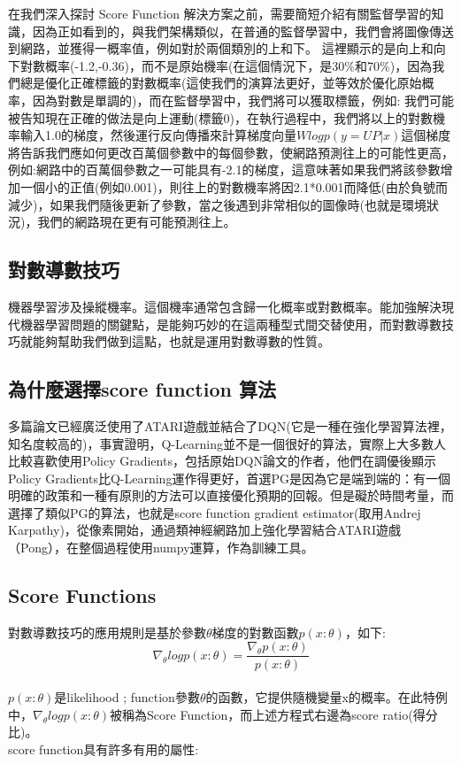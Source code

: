 \documentclass[14pt,a4paper]{report}  %
\begin{document}
 在我們深入探討 Score Function 解決方案之前，需要簡短介紹有關監督學習的知識，因為正如看到的，與我們架構類似，在普通的監督學習中，我們會將圖像傳送到網路，並獲得一概率值，例如對於兩個類別的上和下。 這裡顯示的是向上和向下對數概率(-1.2,-0.36)，而不是原始機率(在這個情況下，是30$\%$和70$\%$)，因為我們總是優化正確標籤的對數概率(這使我們的演算法更好，並等效於優化原始概率，因為對數是單調的)，而在監督學習中，我們將可以獲取標籤，例如:
我們可能被告知現在正確的做法是向上運動(標籤0)，在執行過程中，我們將以上的對數機率輸入1.0的梯度，然後運行反向傳播來計算梯度向量$Wlogp(y=UP|x)$這個梯度將告訴我們應如何更改百萬個參數中的每個參數，使網路預測往上的可能性更高，例如:網路中的百萬個參數之一可能具有-2.1的梯度，這意味著如果我們將該參數增加一個小的正值(例如0.001)，則往上的對數機率將因2.1*0.001而降低(由於負號而減少)，如果我們隨後更新了參數，當之後遇到非常相似的圖像時(也就是環境狀況)，我們的網路現在更有可能預測往上。\\

\subsection{對數導數技巧}
 機器學習涉及操縱機率。這個機率通常包含歸一化概率或對數概率。能加強解決現代機器學習問題的關鍵點，是能夠巧妙的在這兩種型式間交替使用，而對數導數技巧就能夠幫助我們做到這點，也就是運用對數導數的性質。\\
\subsection{為什麼選擇score function 算法}
 多篇論文已經廣泛使用了ATARI遊戲並結合了DQN(它是一種在強化學習算法裡，知名度較高的)，事實證明，Q-Learning並不是一個很好的算法，實際上大多數人比較喜歡使用Policy Gradients，包括原始DQN論文的作者，他們在調優後顯示Policy Gradients比Q-Learning運作得更好，首選PG是因為它是端到端的：有一個明確的政策和一種有原則的方法可以直接優化預期的回報。但是礙於時間考量，而選擇了類似PG的算法，也就是score function gradient estimator(取用Andrej Karpathy)，從像素開始，通過類神經網路加上強化學習結合ATARI遊戲（Pong），在整個過程使用numpy運算，作為訓練工具。\\ 
\subsection{Score Functions}
 對數導數技巧的應用規則是基於參數$\theta$梯度的對數函數$p(x:\theta)$，如下:\\
$$\nabla_\theta logp(x:\theta)=\frac{\nabla_\theta p(x:\theta)}{p(x:\theta)}$$\\
$p(x:\theta)$是likelihood ; function參數$\theta$的函數，它提供隨機變量x的概率。在此特例中，$\nabla_\theta logp(x:\theta)$被稱為Score Function，而上述方程式右邊為score ratio(得分比)。\\
score function具有許多有用的屬性:\\
\end{document}
